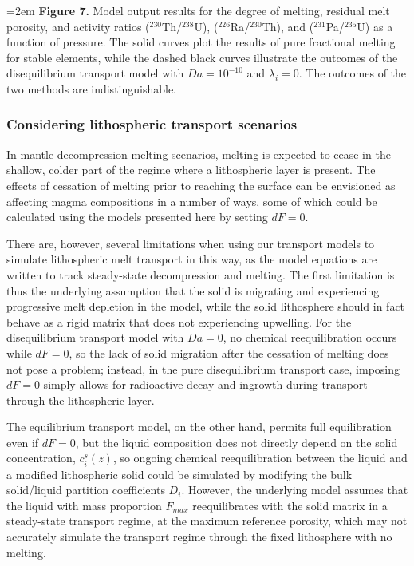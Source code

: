 \documentclass[11pt]{article}
\begin{document}
\hangindent=2em
    \textbf{Figure 7.} Model output results for the degree of melting, residual melt porosity, and activity ratios ($^{230}$Th/$^{238}$U), ($^{226}$Ra/$^{230}$Th), and ($^{231}$Pa/$^{235}$U) as a function of pressure. The solid curves plot the results of pure fractional melting for stable elements, while the dashed black curves illustrate the outcomes of the disequilibrium transport model with $Da=10^{-10}$ and $\lambda_i=0$. The outcomes of the two methods are indistinguishable.

\bigskip

    \hypertarget{considering-lithospheric-transport-scenarios}{%
\subsubsection{Considering lithospheric transport scenarios}\label{considering-lithospheric-transport-scenarios}}

In mantle decompression melting scenarios, melting is expected to cease in the shallow, colder part of the regime where a lithospheric layer is present. The effects of cessation of melting prior to reaching the surface can be envisioned as affecting magma compositions in a number of ways, some of which could be calculated using the models presented here by setting $dF=0$.

There are, however, several limitations when using our transport models to simulate lithospheric melt transport in this way, as the model equations are written to track steady-state decompression and melting. The first limitation is thus the underlying assumption that the solid is migrating and experiencing progressive melt depletion in the model, while the solid lithosphere should in fact behave as a rigid matrix that does not experiencing upwelling. For the disequilibrium transport model with $Da=0$, no chemical reequilibration occurs while $dF=0$, so the lack of solid migration after the cessation of melting does not pose a problem; instead, in the pure disequilibrium transport case, imposing $dF=0$ simply allows for radioactive decay and ingrowth during transport through the lithospheric layer.

The equilibrium transport model, on the other hand, permits full equilibration even if $dF=0$, but the liquid composition does not directly depend on the solid concentration, $c_i^s(z)$, so ongoing chemical reequilibration between the liquid and a modified lithospheric solid could be simulated by modifying the bulk solid/liquid partition coefficients $D_i$. However, the underlying model assumes that the liquid with mass proportion $F_{max}$ reequilibrates with the solid matrix in a steady-state transport regime, at the maximum reference porosity, which may not accurately simulate the transport regime through the fixed lithosphere with no melting.
\end{document}
